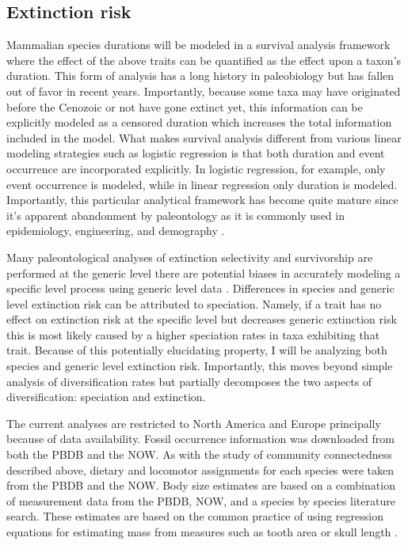 \documentclass[11pt,letterpaper]{article}
\begin{document}
\subsection{Extinction risk}
Mammalian species durations will be modeled in a survival analysis framework where the effect of the above traits can be quantified as the effect upon a taxon's duration. This form of analysis has a long history in paleobiology \citep{Simpson1944,Simpson1953,VanValen1979,Baumiller1993,Foote1988} but has fallen out of favor in recent years. Importantly, because some taxa may have originated before the Cenozoic or not have gone extinct yet, this information can be explicitly modeled as a censored duration which increases the total information included in the model. What makes survival analysis different from various linear modeling strategies such as logistic regression is that both duration and event occurrence are incorporated explicitly. In logistic regression, for example, only event occurrence is modeled, while in linear regression only duration is modeled. Importantly, this particular analytical framework has become quite mature since it's apparent abandonment by paleontology as it is commonly used in epidemiology, engineering, and demography \citep{Kleinbaum2005}. 

Many paleontological analyses of extinction selectivity and survivorship are performed at the generic level \citep{Tomiya2013,Liow2008,Harnik2013,Finnegan2008,Foote2006} there are potential biases in accurately modeling a specific level process using generic level data \citep{Raup1975,Sepkoski1975,Simpson2006,Raup1991a,VanValen1979}. Differences in species and generic level extinction risk can be attributed to speciation. Namely, if a trait has no effect on extinction risk at the specific level but decreases generic extinction risk this is most likely caused by a higher speciation rates in taxa exhibiting that trait. Because of this potentially elucidating property, I will be analyzing both species and generic level extinction risk. Importantly, this moves beyond simple analysis of diversification rates but partially decomposes the two aspects of diversification: speciation and extinction.

The current analyses are restricted to North America and Europe principally because of data availability. Fossil occurrence information was downloaded from both the PBDB and the NOW. As with the study of community connectedness described above, dietary and locomotor assignments for each species were taken from the PBDB and the NOW. Body size estimates are based on a combination of measurement data from the PBDB, NOW, and a species by species literature search. These estimates are based on the common practice of using regression equations for estimating mass from measures such as tooth area or skull length \citep{Alroy1998,Tomiya2013,Jernvall2004,Alroy2009,Slater2013a}.
\end{document}
